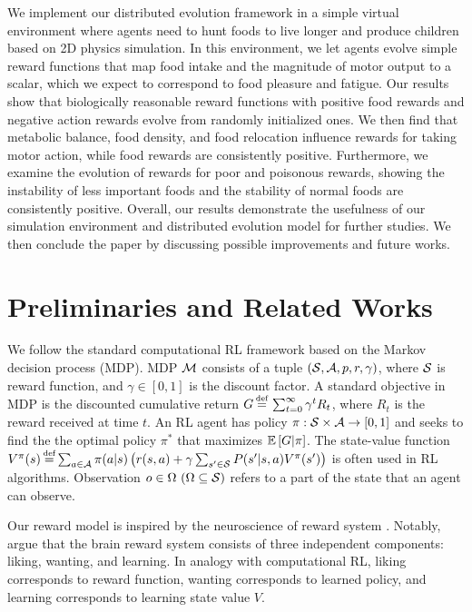 We implement our distributed evolution framework in a simple virtual environment where agents need to hunt foods to live longer and produce children based on 2D physics simulation. In this environment, we let agents evolve simple reward functions that map food intake and the magnitude of motor output to a scalar, which we expect to correspond to food pleasure and fatigue. Our results show that biologically reasonable reward functions with positive food rewards and negative action rewards evolve from randomly initialized ones. We then find that metabolic balance, food density, and food relocation influence rewards for taking motor action, while food rewards are consistently positive. Furthermore, we examine the evolution of rewards for poor and poisonous rewards, showing the instability of less important foods and the stability of normal foods are consistently positive. Overall, our results demonstrate the usefulness of our simulation environment and distributed evolution model for further studies. We then conclude the paper by discussing possible improvements and future works.

\section{Preliminaries and Related Works}\label{sec:related}
We follow the standard computational RL framework \citep{suttonReinforcementLearningIntroduction2018} based on the Markov decision process (MDP). MDP $\mathcal{M}{}$ consists of a tuple $(\mathcal{S}{}, \mathcal{A}{}, p, r, \gamma)$, where $\mathcal{S}{}$ is reward function, and $\gamma \in [0, 1]$ is the discount factor. A standard objective in MDP is the discounted cumulative return $G \defequal{} \sum_{t=0}^{\infty}\gamma^t R_{t}$, where $R_t$ is the reward received at time $t$. An RL agent has policy $\pi: \mathcal{S} \times \mathcal{A} \rightarrow [0, 1]$ and seeks to find the the optimal policy $\pi^{*}$ that maximizes $\mathbb{E} \left[G|\pi\right]$. The state-value function $V^\pi(s) \defequal \sum_{a \in \A} \pi(a|s) \left( r(s, a) + \gamma \sum_{s' \in \X} P(s'|s, a) V^\pi(s') \right)$ is often used in RL algorithms. Observation $o \in \Omega~(\Omega \subseteq \mathcal{S})$ refers to a part of the state that an agent can observe.

Our reward model is inspired by the neuroscience of reward system \citep{schultzNeuronalRewardDecision2015, berridgePleasureSystemsBrain2015}. Notably, \citet{berridgeDissectingComponentsReward2009} argue that the brain reward system consists of three independent components: liking, wanting, and learning. In analogy with computational RL, liking corresponds to reward function, wanting corresponds to learned policy, and learning corresponds to learning state value $V$.

